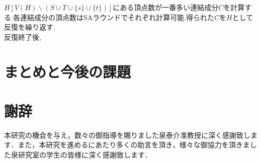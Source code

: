 \documentclass{thesis}
\theoremstyle{definition}
\begin{document}
$H[V(H) \backslash (S \cup T \cup \{s\} \cup \{t\})]$にある頂点数が一番多い連結成分$C$を計算する.各連結成分の頂点数はSAラウンドでそれぞれ計算可能.得られた$C$を$H$として反復を繰り返す.\\
反復終了後,

\chapter{まとめと今後の課題}

\chapter{謝辞}
本研究の機会を与え，数々の御指導を賜りました泉泰介准教授に深く感謝致します．また，本研究を進めるにあたり多くの助言を頂き，様々な御協力を頂きました泉研究室の学生の皆様に深く感謝致します．

\nocite{*}


%
\end{document}
